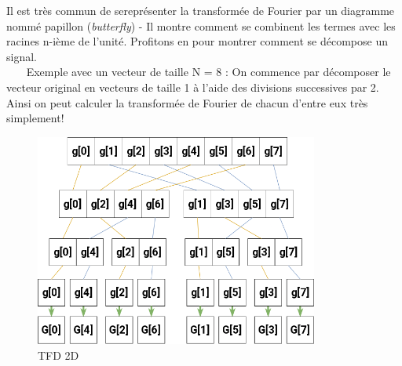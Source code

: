 \documentclass{article}
\begin{document}
Il est très commun de sereprésenter la transformée de Fourier par un diagramme nommé papillon (\textit{butterfly}) - Il montre comment se combinent les termes avec les racines n-ième de l'unité. Profitons en pour montrer comment se décompose un signal. 
\\~~~
\noindent Exemple avec un vecteur de taille N = 8 :
\newpage On commence par décomposer le vecteur original en vecteurs de taille 1 à l'aide des divisions successives par 2. Ainsi on peut calculer la transformée de Fourier de chacun d'entre eux très simplement!
\begin{figure}[!htb]
	\centering
	\includegraphics[height=7cm]{./assets/divide.png}
	\caption{TFD 2D}
	\label{fig:divide}
\end{figure}
\end{document}
